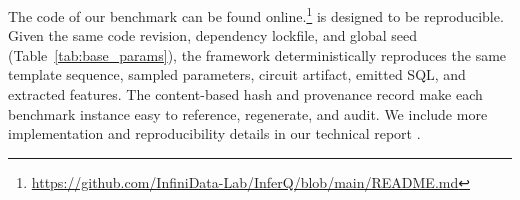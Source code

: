  \medskip
{} The code of our benchmark can be found online.\footnote{\url{https://github.com/InfiniData-Lab/InferQ/blob/main/README.md}}
\sys is designed to be reproducible. Given the same code revision, dependency
lockfile, and global seed (Table~\ref{tab:base_params}), the framework deterministically
reproduces the same template sequence, sampled parameters, circuit artifact, emitted SQL,
and extracted features. The content-based hash and provenance record make each benchmark
instance easy to reference, regenerate, and audit. We include more implementation and reproducibility
details in our technical report \cite{inferqtech}.



